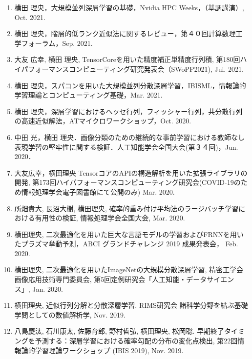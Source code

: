 \documentclass[margin,line]{cv}
\begin{document}
\begin{resume}
\begin{enumerate}
\item 横田 理央，大規模並列深層学習の基礎，Nvidia HPC Weeks，（基調講演）, Oct. 2021.

\item 横田 理央，階層的低ランク近似法に関するレビュー，第４０回計算数理工学フォーラム，Sep. 2021.

\item 大友 広幸, 横田 理央, TensorCoreを用いた精度補正単精度行列積, 第180回ハイパフォーマンスコンピューティング研究発表会（SWoPP2021), Jul. 2021.

\item 横田 理央，スパコンを用いた大規模並列分散深層学習，IBISML，情報論的学習理論とコンピューティング基礎，Mar. 2021.

\item 横田 理央，深層学習におけるヘッセ行列，フィッシャー行列，共分散行列の高速近似解法，ATマイクロワークショップ，Oct. 2020.

\item 中田 光，横田 理央．画像分類のための継続的な事前学習における教師なし表現学習の堅牢性に関する検証．人工知能学会全国大会(第３４回)，Jun. 2020．

\item 大友広幸，横田理央 TensorコアのAPIの構造解析を用いた拡張ライブラリの開発, 第173回ハイパフォーマンスコンピューティング研究会(COVID-19のため情報処理学会電子図書館にて公開のみ) Mar. 2020.

\item 所畑貴大, 長沼大樹, 横田理央, 確率的重み付け平均法のラージバッチ学習における有用性の検証, 情報処理学会全国大会, Mar. 2020.

\item 横田理央, 二次最適化を用いた巨大な言語モデルの学習およびFRNNを用いたプラズマ挙動予測，ABCI グランドチャレンジ 2019 成果発表会， Feb. 2020.

\item 横田理央, 二次最適化を用いたImageNetの大規模分散深層学習, 精密工学会　画像応用技術専門委員会, 第5回定例研究会「人工知能・データサイエンス」, Jan. 2020.

\item 横田理央, 近似行列分解と分散深層学習, RIMS研究会 諸科学分野を結ぶ基礎学問としての数値解析学, Nov. 2019.

\item 八島慶汰, 石川康太, 佐藤育郎, 野村哲弘, 横田理央, 松岡聡. 早期終了タイミングを予測する：深層学習における確率勾配の分布の変化点検出, 第22回情報論的学習理論ワークショップ (IBIS 2019), Nov. 2019.


\end{enumerate}
\end{resume}
\end{document}
